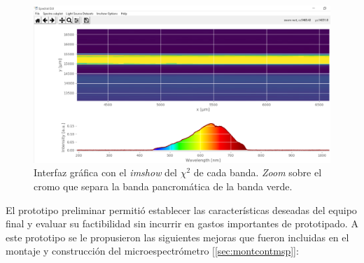 \begin{figure}[H]
	\centering
	\includegraphics[width=1.0\textwidth]{Figs/microespectrometro/chidisp.png}
	\caption{Interfaz gráfica con el \textit{imshow} del $\chi^{2}$ de cada banda. \textit{Zoom} sobre el cromo que separa la banda pancromática de la banda verde.}
	\label{fig:GUI01}
\end{figure}

El prototipo preliminar permitió establecer las características deseadas del equipo final y evaluar su factibilidad sin incurrir en gastos importantes de prototipado. A este prototipo se le propusieron las siguientes mejoras que fueron incluidas en el montaje y construcción del microespectrómetro [\ref{sec:montcontmsp}]:

